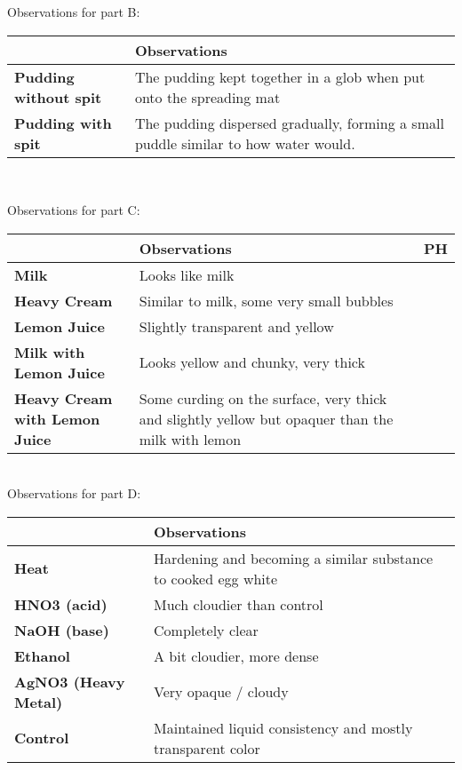 \documentclass[12pt]{article}
\begin{document}
Observations for part B:\\
\begin{tabularx}{1\textwidth} { 
  | >{\centering\arraybackslash}X 
  | >{\centering\arraybackslash}X | }
 \hline
      & \textbf{Observations} \\
 \hline
    \textbf{Pudding without spit} & The pudding kept together in a glob when put onto the spreading mat \\
\hline
    \textbf{Pudding with spit} & The pudding dispersed gradually, forming a small puddle similar to how water would. \\
\hline
\end{tabularx}\\

\newpage

Observations for part C:\\
\begin{tabularx}{1\textwidth} { 
  | >{\centering\arraybackslash}X 
  | >{\centering\arraybackslash}X
  | >{\centering\arraybackslash}X | }
 \hline
      & \textbf{Observations} & \textbf{PH} \\
 \hline
    \textbf{Milk} & Looks like milk & 6 \\
\hline
    \textbf{Heavy Cream} & Similar to milk, some very small bubbles & 5 \\
\hline
    \textbf{Lemon Juice} & Slightly transparent and yellow & 3 \\
\hline
    \textbf{Milk with Lemon Juice} & Looks yellow and chunky, very thick & 3 \\
\hline
    \textbf{Heavy Cream with Lemon Juice} & Some curding on the surface, very thick and slightly yellow but opaquer than the milk with lemon & 3 \\
\hline
\end{tabularx}\\

Observations for part D:\\
\begin{tabularx}{1\textwidth} { 
  | >{\centering\arraybackslash}X 
  | >{\centering\arraybackslash}X | }
 \hline
      & \textbf{Observations} \\
 \hline
    \textbf{Heat} & Hardening and becoming a similar substance to cooked egg white \\
\hline
    \textbf{HNO3 (acid)} & Much cloudier than control \\
\hline
    \textbf{NaOH (base)} & Completely clear \\
\hline
    \textbf{Ethanol} & A bit cloudier, more dense \\
\hline
    \textbf{AgNO3 (Heavy Metal)} & Very opaque / cloudy \\
\hline
    \textbf{Control} & Maintained liquid consistency and mostly transparent color \\
\hline
\end{tabularx}\\
\end{document}
